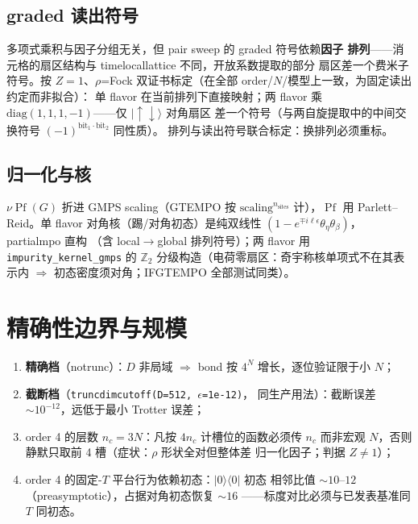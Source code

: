 \documentclass[11pt,a4paper]{ctexart}
\newcommand{\Pf}{\operatorname{Pf}}
\newcommand{\Deff}{D}             %
\begin{document}
\subsection{graded 读出符号}

多项式乘积与因子分组无关，但 pair sweep 的 graded 符号依赖\textbf{因子
排列}——消元格的扇区结构与 timelocallattice 不同，开放系数提取的部分
扇区差一个费米子符号。按 $Z=1$、$\rho$=Fock 双证书标定（在全部
order/$N$/模型上一致，为固定读出约定而非拟合）：
单 flavor 在当前排列下直接映射；两 flavor 乘
$\mathrm{diag}(1,1,1,-1)$——仅 $|\uparrow\downarrow\rangle$ 对角扇区
差一个符号（与两自旋提取中的中间交换符号
$(-1)^{\mathrm{bit}_1\cdot\mathrm{bit}_2}$ 同性质）。
排列与读出符号联合标定：换排列必须重标。

\subsection{归一化与核}

$\nu\Pf(G)$ 折进 GMPS scaling（GTEMPO 按 $\mathrm{scaling}^{n_{\mathrm{sites}}}$
计），$\Pf$ 用 Parlett--Reid。单 flavor 对角核（踢/对角初态）是纯双线性
$(1-e^{\mp i\ell\epsilon}\theta_\eta\theta_\beta)$，partialmpo 直构
（含 local$\to$global 排列符号）；两 flavor 用 \texttt{impurity\_kernel\_gmps}
的 $\mathbb Z_2$ 分级构造（电荷零扇区：奇宇称核单项式不在其表示内
$\Rightarrow$ 初态密度须对角；IFGTEMPO 全部测试同类）。

\section{精确性边界与规模}

\begin{enumerate}
\item \textbf{精确档}（notrunc）：$\Deff$ 非局域 $\Rightarrow$ bond 按
  $4^N$ 增长，逐位验证限于小 $N$；
\item \textbf{截断档}（\texttt{truncdimcutoff(D=512, $\epsilon$=1e-12)}，
  同生产用法）：截断误差 $\sim10^{-12}$，远低于最小 Trotter 误差；
\item order 4 的层数 $n_c=3N$：凡按 $4n_c$ 计槽位的函数必须传 $n_c$
  而非宏观 $N$，否则静默只取前 4 槽（症状：$\rho$ 形状全对但整体差
  归一化因子；判据 $Z\ne1$）；
\item order 4 的固定-$T$ 平台行为依赖初态：$|0\rangle\langle0|$ 初态
  相邻比值 $\sim10$--$12$（preasymptotic），占据对角初态恢复 $\sim16$
  ——标度对比必须与已发表基准同 $T$ 同初态。
\end{enumerate}
\end{document}
